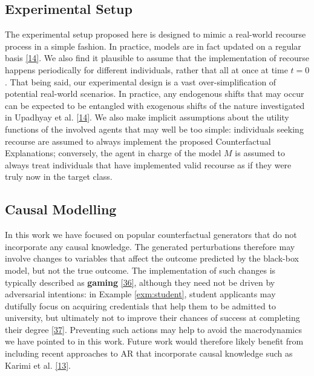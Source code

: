 \documentclass[conference,final,]{IEEEtran}
\theoremstyle{definition}
\theoremstyle{definition}
\theoremstyle{definition}
\theoremstyle{definition}
\theoremstyle{remark}
\begin{document}
\hypertarget{experimental-setup}{%
\subsection{Experimental Setup}\label{experimental-setup}}

The experimental setup proposed here is designed to mimic a real-world recourse process in a simple fashion. In practice, models are in fact updated on a regular basis \protect\hyperlink{ref-upadhyay2021robust}{{[}14{]}}. We also find it plausible to assume that the implementation of recourse happens periodically for different individuals, rather that all at once at time \(t=0\). That being said, our experimental design is a vast over-simplification of potential real-world scenarios. In practice, any endogenous shifts that may occur can be expected to be entangled with exogenous shifts of the nature investigated in Upadhyay et al. \protect\hyperlink{ref-upadhyay2021robust}{{[}14{]}}. We also make implicit assumptions about the utility functions of the involved agents that may well be too simple: individuals seeking recourse are assumed to always implement the proposed Counterfactual Explanations; conversely, the agent in charge of the model \(M\) is assumed to always treat individuals that have implemented valid recourse as if they were truly now in the target class.

\hypertarget{causal-modelling}{%
\subsection{Causal Modelling}\label{causal-modelling}}

In this work we have focused on popular counterfactual generators that do not incorporate any causal knowledge. The generated perturbations therefore may involve changes to variables that affect the outcome predicted by the black-box model, but not the true outcome. The implementation of such changes is typically described as \textbf{gaming} \protect\hyperlink{ref-miller2020strategic}{{[}36{]}}, although they need not be driven by adversarial intentions: in Example \ref{exm:student}, student applicants may dutifully focus on acquiring credentials that help them to be admitted to university, but ultimately not to improve their chances of success at completing their degree \protect\hyperlink{ref-barocas2017fairness}{{[}37{]}}. Preventing such actions may help to avoid the macrodynamics we have pointed to in this work. Future work would therefore likely benefit from including recent approaches to AR that incorporate causal knowledge such as Karimi et al. \protect\hyperlink{ref-karimi2021algorithmic}{{[}13{]}}.
\end{document}
